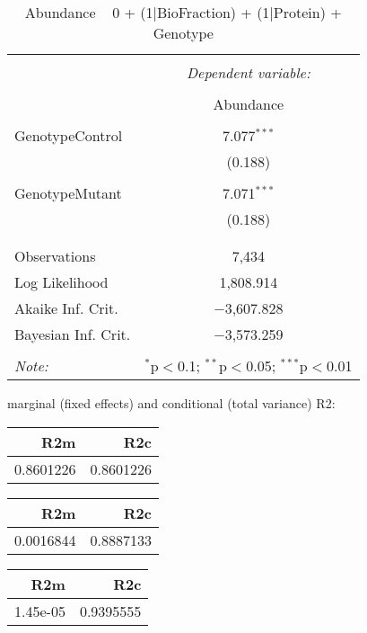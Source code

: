\documentclass[11pt]{report}
\begin{document}
\begin{table}[!htbp] \centering 
  \caption{Abundance ~ 0 + (1|BioFraction) + (1|Protein) + Genotype} 
  \label{} 
\begin{tabular}{@{\extracolsep{5pt}}lc} 
\\[-1.8ex]\hline 
\hline \\[-1.8ex] 
 & \multicolumn{1}{c}{\textit{Dependent variable:}} \\ 
\cline{2-2} 
\\[-1.8ex] & Abundance \\ 
\hline \\[-1.8ex] 
 GenotypeControl & 7.077$^{***}$ \\ 
  & (0.188) \\ 
  & \\ 
 GenotypeMutant & 7.071$^{***}$ \\ 
  & (0.188) \\ 
  & \\ 
\hline \\[-1.8ex] 
Observations & 7,434 \\ 
Log Likelihood & 1,808.914 \\ 
Akaike Inf. Crit. & $-$3,607.828 \\ 
Bayesian Inf. Crit. & $-$3,573.259 \\ 
\hline 
\hline \\[-1.8ex] 
\textit{Note:}  & \multicolumn{1}{r}{$^{*}$p$<$0.1; $^{**}$p$<$0.05; $^{***}$p$<$0.01} \\ 
\end{tabular} 
\end{table} 
marginal (fixed effects) and conditional (total variance) R2:

\begin{tabular}{r|r}
\hline
R2m & R2c\\
\hline
0.8601226 & 0.8601226\\
\hline
\end{tabular}

\begin{tabular}{r|r}
\hline
R2m & R2c\\
\hline
0.0016844 & 0.8887133\\
\hline
\end{tabular}

\begin{tabular}{r|r}
\hline
R2m & R2c\\
\hline
1.45e-05 & 0.9395555\\
\hline
\end{tabular}
\end{document}
